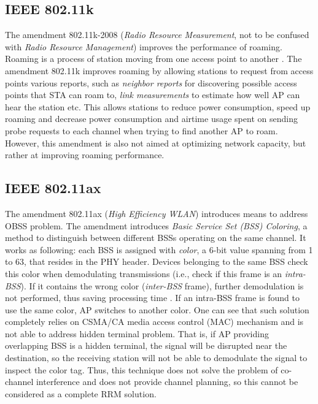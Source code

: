 
\subsection {IEEE 802.11k}
\label{chap:lr:sec:80211k}
The amendment 802.11k-2008 \cite{ieee80211k} (\textit{Radio Resource Measurement}, not to be confused with \textit{Radio Resource Management}) improves the performance of roaming. Roaming is a process of station moving from one access point to another \cite{colemanCWNACertifiedWireless2021}. The amendment 802.11k improves roaming by allowing stations to request from access points various reports, such as \textit{neighbor reports} for discovering possible access points that STA can roam to, \textit{link measurements} to estimate how well AP can hear the station etc. This allows stations to reduce power consumption, speed up roaming and decrease power consumption and airtime usage spent on sending probe requests to each channel when trying to find another AP to roam.
However, this amendment is also not aimed at optimizing network capacity, but rather at improving roaming performance.

\subsection {IEEE 802.11ax}
\label{chap:lr:sec:80211ax}

The amendment 802.11ax \cite{80211ax} (\textit{High Efficiency WLAN}) introduces means to address OBSS problem. The amendment introduces \textit{Basic Service Set (BSS) Coloring}, a method to distinguish between different BSSs operating on the same channel. It works as following: each BSS is assigned with \textit{color}, a 6-bit value spanning from 1 to 63, that resides in the PHY header. Devices belonging to the same BSS check this color when demodulating transmissions (i.e., check if this frame is an \textit{intra-BSS}). If it contains the wrong color (\textit{inter-BSS} frame), further demodulation is not performed, thus saving processing time \cite{CiscoCatalyst9800}.
If an intra-BSS frame is found to use the same color, AP switches to another color.
One can see that such solution completely relies on CSMA/CA media access control (MAC) mechanism and is not able to address hidden terminal problem. That is, if AP providing overlapping BSS is a hidden terminal, the signal will be disrupted near the destination, so the receiving station will not be able to demodulate the signal to inspect the color tag.
Thus, this technique does not solve the problem of co-channel interference and does not provide channel planning, so this cannot be considered as a complete RRM solution.



